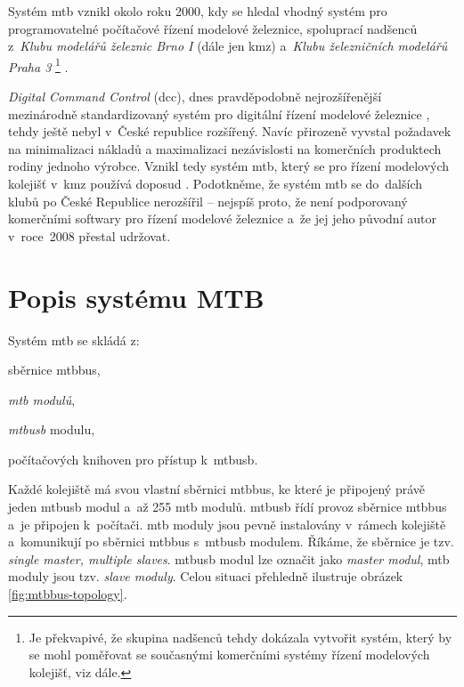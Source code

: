 Systém \gls{mtb} vznikl okolo roku 2000, kdy se hledal vhodný systém pro
programovatelné počítačové řízení modelové železnice, spoluprací nadšenců
z~\textit{Klubu modelářů železnic Brno I} (dále jen \gls{kmz}) a~\textit{Klubu
železničních modelářů Praha 3} \footnote{Je překvapivé, že
skupina nadšenců tehdy dokázala vytvořit systém, který by se mohl poměřovat se
současnými komerčními systémy řízení modelových kolejišť, viz dále.} \cite{mtb:web}.

\textit{Digital Command Control} (\gls{dcc}), dnes pravděpodobně
nejrozšířenější\footnotemark\\mezinárodně standardizovaný systém pro digitální
řízení modelové železnice \cite{dcc_intro:web}, tehdy ještě nebyl v~České republice
rozšířený. Navíc přirozeně vyvstal požadavek na minimalizaci nákladů
a maximalizaci nezávislosti na komerčních produktech rodiny jednoho výrobce. Vznikl
tedy systém \gls{mtb}, který se pro řízení modelových kolejišť v~\gls{kmz}
používá doposud \cite{kmz_rizeni:web}. Podotkněme, že systém \gls{mtb} se
do~dalších klubů po České Republice nerozšířil – nejspíš proto, že není
podporovaný komerčními softwary pro řízení modelové železnice a~že jej jeho
původní autor v~roce~2008 přestal udržovat.


\section{Popis systému MTB} \label{sec:mtbbus}

Systém \gls{mtb} se skládá z:

\begin{compactenum}
\item sběrnice \gls{mtbbus},
\item \textit{\gls{mtb} modulů},
\item \textit{\gls{mtbusb}} modulu,
\item počítačových knihoven pro přístup k~\gls{mtbusb}.
\end{compactenum}

Každé kolejiště má svou vlastní sběrnici \gls{mtbbus}, ke které je připojený
právě jeden \gls{mtbusb} modul a~až 255 \gls{mtb} modulů.
\gls{mtbusb} řídí provoz sběrnice \gls{mtbbus} a~je připojen k~počítači.
\gls{mtb} moduly jsou pevně instalovány v~rámech kolejiště a~komunikují po
sběrnici \gls{mtbbus} s~\gls{mtbusb} modulem. Říkáme, že sběrnice je tzv.
\textit{single master, multiple slaves}. \gls{mtbusb} modul lze označit jako
\textit{master modul}, \gls{mtb} moduly jsou tzv. \textit{slave moduly}.
Celou situaci přehledně ilustruje obrázek \ref{fig:mtbbus-topology}.

